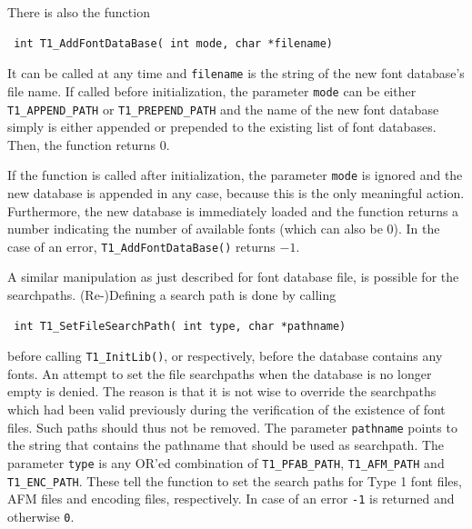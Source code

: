 There is also the function \precorr
\begin{verbatim}
 int T1_AddFontDataBase( int mode, char *filename)
\end{verbatim}\postcorr
It can be called at any time and \verb+filename+ is the string of the new font
database's file name. If called before initialization, the parameter
\verb+mode+ can be either \verb+T1_APPEND_PATH+ or \verb+T1_PREPEND_PATH+ and
the name of the new font database simply is either appended or prepended to
the existing list of font databases. Then, the function returns $0$. 

If the function is called after initialization, the parameter \verb+mode+ is
ignored and the new database is appended in any case, because this is the only
meaningful action. Furthermore, the new database is immediately loaded and the
function returns a number indicating the number of available fonts 
(which can also be 0). In the case of an error, \verb+T1_AddFontDataBase()+
returns $-1$.


A similar manipulation as just described for font database file, is
possible for the searchpaths. (Re-)Defining a search 
path is done by calling 
\precorr
\begin{verbatim}
 int T1_SetFileSearchPath( int type, char *pathname)
\end{verbatim}\postcorr
before calling \verb+T1_InitLib()+, or respectively, before the database
contains any fonts. An attempt to set the file searchpaths when the database
is no longer empty is denied. The reason is that it is not wise to override
the searchpaths which had been valid previously during the verification of the
existence of font files. Such paths should thus not be removed.  The parameter
\verb+pathname+ points to the string that contains the pathname that should be
used as searchpath. The parameter \verb+type+ is any OR'ed combination of
\verb+T1_PFAB_PATH+, \verb+T1_AFM_PATH+ and \verb+T1_ENC_PATH+. These tell the
function to set the search paths for Type 1 font files, AFM files and encoding
files, respectively. In case of an error \verb+-1+ is returned and otherwise
\verb+0+.

